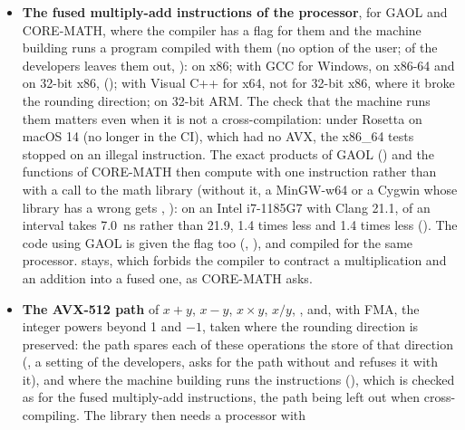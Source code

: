 \begin{itemize}
   and  were an option of their
  own for the NEON intervals, independent of , and are
  gone.\newinvfive
{}%
%
\item[$\bullet$] \textbf{The fused multiply-add instructions of the
  processor}, for GAOL and CORE-MATH, where the compiler has a flag for them
  and the machine building runs a program compiled with them (no option of
  the user;  of the developers leaves them out,
  ):  on x86; with GCC for
  Windows, on x86-64 and on 32-bit x86,  ();
   with Visual C++ for x64, not for 32-bit x86, where it
  broke the rounding direction;  on
  32-bit ARM. The check that the machine runs them matters even when it is
  not a cross-compilation: under Rosetta on macOS 14 (no longer in the CI),
  which had no AVX, the x86\_64 tests stopped on an illegal instruction. The
  exact products of GAOL () and the functions of CORE-MATH
  then compute  with one instruction rather than with a call to
  the math library (without it, a MinGW-w64 or a Cygwin whose library has a
  wrong  gets , ): on an Intel i7-1185G7 with Clang 21.1,  of an
  interval takes 7.0~ns rather than 21.9,  1.4 times less and  1.4 times less (). The code
  using GAOL is given the flag too (, ), and
  compiled for the same processor.  stays, which
  forbids the compiler to contract a multiplication and an addition into a
  fused one, as CORE-MATH asks.\newinvfive
{}%
\item[$\bullet$] \textbf{The AVX-512 path} of $x + y$, $x - y$,
  $x \times y$, $x / y$, ,  and, with FMA, the
  integer powers beyond 1 and $-1$, taken where the rounding direction is
  preserved: the path spares each of these operations the store of that
  direction (, a setting of the developers, asks
  for the path without  and refuses it with it), and where the
  machine building runs the instructions (),
  which is checked as for the fused multiply-add instructions, the path being
  left out when cross-compiling. The library then needs a processor with

\end{itemize}
